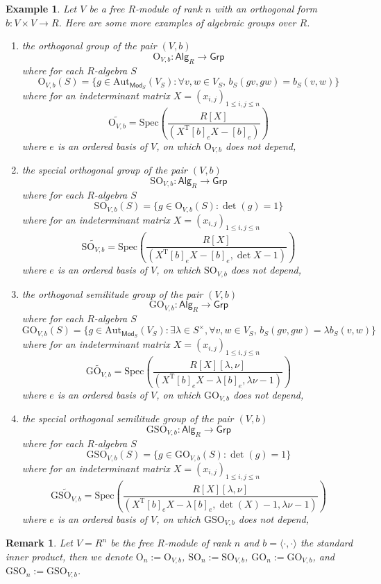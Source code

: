 \documentclass[10pt]{book}
\theoremstyle{bookplain}
\theoremstyle{bookdefinition}
\newtheorem{example}[theorem]{Example}
\theoremstyle{bookremark}
\newtheorem{remark}[theorem]{Remark}
\begin{document}
\begin{example}Let $V$ be a free $R$-module of rank $n$ with an orthogonal form $b:V\times V\rightarrow R$. Here are some more examples of algebraic groups over $R$.
    \begin{enumerate}
        \item the \textit{orthogonal group} of the pair $(V,b)$
        \[\mathrm{O}_{V,b}:\mathsf{Alg}_R\rightarrow \mathsf{Grp} \]
        where for each $R$-algebra $S$ 
        \[\mathrm{O}_{V,b}(S)=\{g\in \mathrm{Aut}_{\mathsf{Mod}_S}(V_S):\forall v,w\in V_S,\,b_S(gv,gw)=b_S(v,w)\}\]
        where for an indeterminant matrix $X=(x_{i,j})_{1\le i,j\le n}$ 
        \[\widetilde{\mathrm{O}_{V,b}}=\mathrm{Spec}\left(\frac{R[X]}{(X^\mathrm{T}[b]_eX-[b]_e)}\right)\]
        where $e$ is an ordered basis of $V$, on which $\mathrm O_{V,b}$ does not depend,
        \item the \textit{special orthogonal group} of the pair $(V,b)$
        \[\mathrm{SO}_{V,b}:\mathsf{Alg}_R\rightarrow \mathsf{Grp} \]
        where for each $R$-algebra $S$ 
        \[\mathrm{SO}_{V,b}(S)=\{g\in \mathrm O_{V,b}(S):\det(g)=1\}\]
        where for an indeterminant matrix $X=(x_{i,j})_{1\le i,j\le n}$ 
        \[\widetilde{\mathrm{SO}_{V,b}}=\mathrm{Spec}\left(\frac{R[X]}{(X^\mathrm{T}[b]_eX-[b]_e, \det X-1)}\right)\]
        where $e$ is an ordered basis of $V$, on which $\mathrm {SO}_{V,b}$ does not depend,
        
        \item the \textit{orthogonal semilitude group} of the pair $(V,b)$
        \[\mathrm{GO}_{V,b}:\mathsf{Alg}_R\rightarrow \mathsf{Grp} \]
        where for each $R$-algebra $S$ 
        \[\mathrm{GO}_{V,b}(S)=\{g\in \mathrm{Aut}_{\mathsf{Mod}_S}(V_S):\exists\lambda\in S^\times,\forall v,w\in V_S,\,b_S(gv,gw)=\lambda b_S(v,w)\}\]
        where for an indeterminant matrix $X=(x_{i,j})_{1\le i,j\le n}$ 
        \[\widetilde{\mathrm{GO}_{V,b}}=\mathrm{Spec}\left(\frac{R[X][\lambda,\nu]}{(X^\mathrm{T}[b]_eX-\lambda [b]_e, \lambda\nu-1)}\right)\]
        where $e$ is an ordered basis of $V$, on which $\mathrm{GO}_{V,b}$ does not depend,
        
        \item the \textit{special orthogonal semilitude group} of the pair $(V,b)$
        \[\mathrm{GSO}_{V,b}:\mathsf{Alg}_R\rightarrow \mathsf{Grp} \]
        where for each $R$-algebra $S$ 
        \[\mathrm{GSO}_{V,b}(S)=\{g\in \mathrm{GO}_{V,b}(S):\det(g)=1\}\]
        where for an indeterminant matrix $X=(x_{i,j})_{1\le i,j\le n}$ 
        \[\widetilde{\mathrm{GSO}_{V,b}}=\mathrm{Spec}\left(\frac{R[X][\lambda,\nu]}{(X^\mathrm{T}[b]_eX-\lambda [b]_e, \det(X)-1,\lambda\nu-1)}\right)\]
        where $e$ is an ordered basis of $V$, on which $\mathrm{GSO}_{V,b}$ does not depend,
    \end{enumerate}
\end{example}
\begin{remark}Let $V=R^n$ be the free $R$-module of rank $n$ and $b=\langle\cdot,\cdot \rangle$ the standard inner product, then we denote $\mathrm O_n:=\mathrm O_{V,b}$, $\mathrm{SO}_n:=\mathrm{SO}_{V,b}$, $\mathrm{GO}_n:=\mathrm{GO}_{V,b}$, and $\mathrm{GSO}_n:=\mathrm{GSO}_{V,b}$. 
\end{remark}
\end{document}
